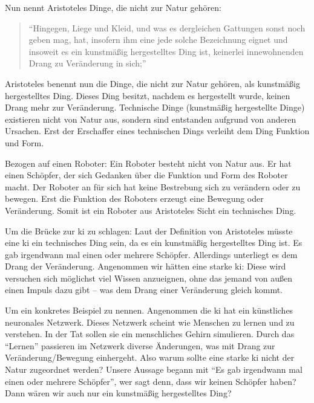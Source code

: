 Nun nennt Aristoteles Dinge, die nicht zur Natur gehören:
\begin{quote}
	\enquote{Hingegen, Liege und Kleid, und was es dergleichen Gattungen sonst noch geben mag, hat, insofern ihm eine jede solche Bezeichnung eignet und insoweit es ein kunstmäßig hergestelltes Ding ist, keinerlei innewohnenden Drang zu Veränderung in sich;}
	\cite[192b8 ff.]{PhysikII} 
\end{quote}
Aristoteles benennt nun die Dinge, die nicht zur Natur gehören, als kunstmäßig hergestelltes Ding. Dieses Ding besitzt, nachdem es hergestellt wurde, keinen Drang mehr zur Veränderung. Technische Dinge (kunstmäßig hergestellte Dinge) existieren nicht von Natur aus, sondern sind entstanden aufgrund von anderen Ursachen. Erst der Erschaffer eines technischen Dings verleiht dem Ding Funktion und Form. 

Bezogen auf einen Roboter: Ein Roboter besteht nicht von Natur aus. Er hat einen Schöpfer, der sich Gedanken über die Funktion und Form des Roboter macht. Der Roboter an für sich hat keine Bestrebung sich zu verändern oder zu bewegen. Erst die Funktion des Roboters erzeugt eine Bewegung oder Veränderung. Somit ist ein Roboter aus Aristoteles Sicht ein technisches Ding. 

Um die Brücke zur \ac{ki} zu schlagen: Laut der Definition von Aristoteles müsste eine \ac{ki} ein technisches Ding sein, da es ein kunstmäßig hergestelltes Ding ist. 
Es gab irgendwann mal einen oder mehrere Schöpfer. Allerdings unterliegt es dem Drang der Veränderung. 
Angenommen wir hätten eine starke \ac{ki}: Diese wird versuchen sich möglichst viel Wissen anzueignen, ohne das jemand von außen einen Impuls dazu gibt -- was dem Drang einer Veränderung gleich kommt. 

Um ein konkretes Beispiel zu nennen. Angenommen die \ac{ki} hat ein künstliches neuronales Netzwerk. Dieses Netzwerk scheint wie Menschen zu lernen und zu verstehen. In der Tat sollen sie ein menschliches Gehirn simulieren. 
Durch das \enquote{Lernen} passieren im Netzwerk diverse Änderungen, was mit Drang zur Veränderung/Bewegung einhergeht. Also warum sollte eine starke \ac{ki} nicht der Natur zugeordnet werden? Unsere Aussage begann mit \enquote{Es gab irgendwann mal einen oder mehrere Schöpfer}, wer sagt denn, dass wir keinen Schöpfer haben? Dann wären wir auch nur ein kunstmäßig hergestelltes Ding?


